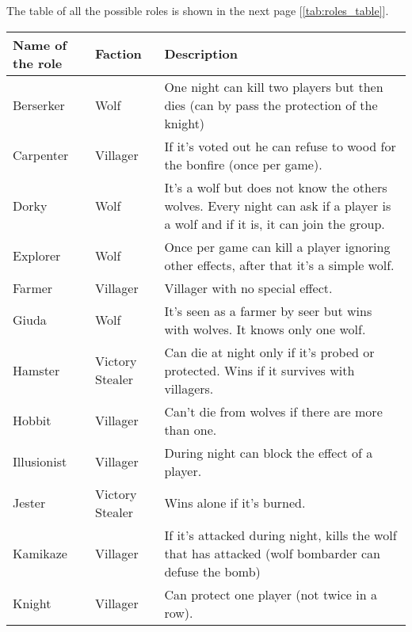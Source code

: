 The table of all the possible roles is shown in the next page [\ref{tab:roles_table}]. 
\begin{center}
    \begin{table}[]
    \centering
    \begin{tabular}{ | m{2.8cm} | m{2.5cm}| m{10cm} |}
        
        \hline
        \centering \textbf{Name of the role} & \centering \textbf{Faction} & \textbf{Description} \\
        \hline
        \centering Berserker & \centering Wolf & One night can kill two players but then dies (can by pass the protection of the knight) \\
        \hline
        \centering Carpenter & \centering Villager & If it's voted out he can refuse to wood for the bonfire (once per game). \\
        \hline
        \centering Dorky & \centering Wolf & It's a wolf but does not know the others wolves. Every night can ask if a player is a wolf and if it is, it can join the group. \\
        \hline
        \centering Explorer & \centering Wolf & Once per game can kill a player ignoring other effects, after that it's a simple wolf. \\
        \hline
        \centering Farmer & \centering Villager & Villager with no special effect. \\
        \hline
        \centering Giuda & \centering Wolf & It's seen as a farmer by seer but wins with wolves. It knows only one wolf. \\
        \hline
        \centering Hamster & \centering Victory Stealer & Can die at night only if it's probed or protected. Wins if it survives with villagers. \\
        \hline
        \centering Hobbit & \centering Villager & Can't die from wolves if there are more than one.\\
        \hline
        \centering Illusionist & \centering Villager & During night can block the effect of a player. \\
        \hline
        \centering Jester & \centering Victory Stealer & Wins alone if it's burned. \\
        \hline
        \centering Kamikaze & \centering Villager & If it's attacked during night, kills the wolf that has attacked (wolf bombarder can defuse the bomb)\\
        \hline
        \centering Knight & \centering Villager & Can protect one player (not twice in a row).\\

\end{tabular}
\end{table}
\end{center}

